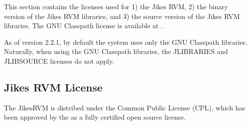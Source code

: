 This section contains the licenses used for 1) the Jikes\trademark
RVM, 2) the binary 
version of the Jikes RVM libraries, and 3) the source version of the
Jikes RVM libraries.  The GNU Classpath license is available
at \xlink{{\tt \classpathURL}}{\classpathURL}.  

As of version 2.2.1, by default the system uses only the GNU Classpath
libraries.  Naturally, when using the GNU Classpath libraries, the JLIBRARIES
and JLIBSOURCE licenses do not apply.


\subsection{Jikes RVM License}
The Jikes\trademark RVM is distribed under the Common Public License (CPL),
which has been approved by the 
as a fully certified open source license.


